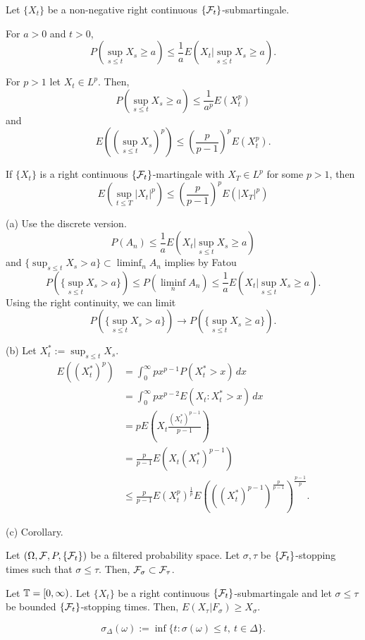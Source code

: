 \documentclass{../../../small}
\begin{document}
\begin{thm}
Let $\{X_t\}$ be a non-negative right continuous $\{\mathcal{F}_t\}$-submartingale.
\begin{parts}
\item For $a>0$ and $t>0$,
\[P(\sup_{s\le t}X_s\ge a)\le\frac1aE(X_t|\sup_{s\le t}X_s\ge a).\]
\item For $p>1$ let $X_t\in L^p$. Then,
\[P(\sup_{s\le t}X_s\ge a)\le\frac1{a^p}E(X_t^p)\]
and
\[E((\sup_{s\le t}X_s)^p)\le(\frac p{p-1})^pE(X_t^p).\]
\item If $\{X_t\}$ is a right continuous $\{\mathcal{F}_t\}$-martingale with $X_T\in L^p$ for some $p>1$, then
\[E(\sup_{t\le T}|X_t|^p)\le(\frac p{p-1})^pE(|X_T|^p)\]
\end{parts}
\end{thm}
\begin{pf}
(a)
Use the discrete version.
\[P(A_n)\le\frac1aE(X_t|\sup_{s\le t}X_s\ge a)\]
and $\{\sup_{s\le t}X_s>a\}\subset\liminf_nA_n$ implies by Fatou
\[P(\{\sup_{s\le t}X_s>a\})\le P(\liminf_nA_n)\le\frac1aE(X_t|\sup_{s\le t}X_s\ge a).\]
Using the right continuity, we can limit
\[P(\{\sup_{s\le t}X_s>a\})\to P(\{\sup_{s\le t}X_s\ge a\}).\]

(b)
Let $X_t^*:=\sup_{s\le t}X_s$.
\begin{align*}
E((X_t^*)^p)
&=\int_0^\infty px^{p-1}P(X_t^*>x)\,dx\\
&=\int_0^\infty px^{p-2}E(X_t:X_t^*>x)\,dx\\
&=pE(X_t\frac{(X_t^*)^{p-1}}{p-1})\\
&=\frac p{p-1}E(X_t(X_t^*)^{p-1})\\
&\le\frac p{p-1}E(X_t^p)^{\frac1p}E(((X_t^*)^{p-1})^{\frac p{p-1}})^{\frac{p-1}p}.
\end{align*}

(c)
Corollary.
\end{pf}

\begin{lem}
Let $(\Omega,\mathcal{F},P,\{\mathcal{F}_t\})$ be a filtered probability space.
Let $\sigma,\tau$ be $\{\mathcal{F}_t\}$-stopping times such that $\sigma\le\tau$.
Then, $\mathcal{F}_\sigma\subset\mathcal{F}_\tau$.
\end{lem}

\begin{thm}
Let $\mathbb{T}=[0,\infty)$.
Let $\{X_t\}$ be a right continuous $\{\mathcal{F}_t\}$-submartingale and let $\sigma\le\tau$ be bounded $\{\mathcal{F}_t\}$-stopping times.
Then, $E(X_\tau|F_\sigma)\ge X_\sigma$.
\end{thm}
\begin{pf}
\[\sigma_\Delta(\omega):=\inf\{t:\sigma(\omega)\le t,\ t\in\Delta\}.\]
\end{pf}
\end{document}

